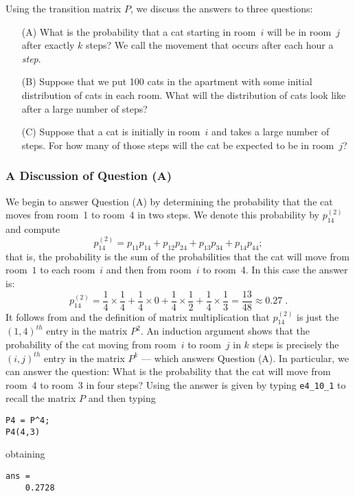 Using the transition matrix $P$, we discuss the answers to three questions:
\begin{enumerate}
\item[(A)] What is the probability that a cat starting in room~$i$ will
be in room~$j$ after exactly $k$ steps?  We call the movement that occurs
after each hour a {\em step\/}.
\item[(B)] Suppose that we put 100 cats in the apartment with some initial
distribution of cats in each room.  What will the distribution of cats
look like after a large number of steps?
\item[(C)] Suppose that a cat is initially in room~$i$ and takes a large
number of steps.  For how many of those steps will the cat be expected to
be in room~$j$?
\end{enumerate}

\subsubsection*{A Discussion of Question (A)}

We begin to answer Question (A) by determining the probability that the
cat moves from room~1 to room~4 in two steps.  We denote this probability
by $p_{14}^{(2)}$ and compute
\begin{equation} \label{E:prob14}
p_{14}^{(2)} = p_{11}p_{14} + p_{12}p_{24} + p_{13}p_{34} + p_{14}p_{44};
\end{equation}
that is, the probability is the sum of the probabilities that the cat will
move from room~$1$ to each room~$i$ and then from room~$i$ to room~4.  In
this case the answer is:
\[
p_{14}^{(2)} = \frac{1}{4}\times\frac{1}{4} + \frac{1}{4}\times0 +
\frac{1}{4}\times\frac{1}{2} + \frac{1}{4}\times\frac{1}{3} =
\frac{13}{48} \approx 0.27\;.
\]
It follows from  and the definition of matrix multiplication
that $p_{14}^{(2)}$ is just the $(1,4)^{th}$ entry in the matrix $P^2$.  An
induction argument shows that the probability of the cat moving from
room~$i$ to room~$j$ in $k$ steps is precisely the $(i,j)^{th}$ entry in the
matrix $P^k$ --- which answers Question (A).  In particular, we can answer the
question: What is the probability that the cat will move from room~4 to room~3
in four steps?  Using \Matlab the answer is given by typing {\tt e4\_10\_1} to
recall the matrix $P$ and then typing
\begin{verbatim}
P4 = P^4;
P4(4,3)
\end{verbatim}
obtaining
\begin{verbatim}
ans =
    0.2728
\end{verbatim}

